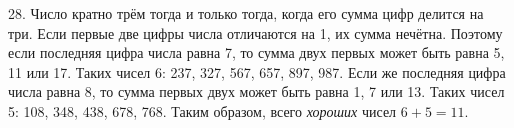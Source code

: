 28. Число кратно трём тогда и только тогда, когда его сумма цифр делится на три. Если первые две цифры числа отличаются на 1, их сумма нечётна. Поэтому если последняя цифра числа равна 7, то сумма двух первых может быть равна 5, 11 или 17. Таких чисел 6: 237, 327, 567, 657, 897, 987. Если же последняя цифра числа равна 8, то сумма первых двух может быть равна 1, 7 или 13. Таких чисел 5: 108, 348, 438, 678, 768. Таким образом, всего {\it хороших} чисел $6+5=11.$\\
